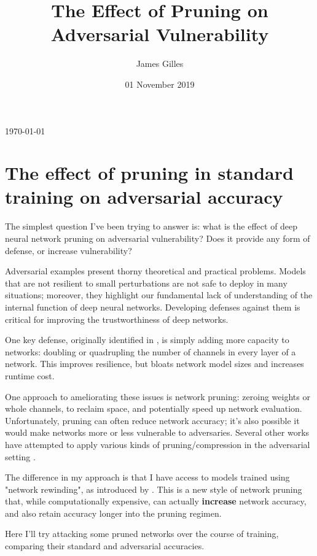 \documentclass[11pt]{article}
\author{James Gilles}
\date{01 November 2019}
\title{The Effect of Pruning on Adversarial Vulnerability}
\renewcommand*{\tableofcontents}{}
\begin{document}
\maketitle
\tableofcontents

\today

\section{The effect of pruning in standard training on adversarial accuracy}
\label{sec:org708dca6}

The simplest question I've been trying to answer is: what is the effect of deep neural network pruning on adversarial vulnerability?
Does it provide any form of defense, or increase vulnerability?

Adversarial examples present thorny theoretical and practical problems.
Models that are not resilient to small perturbations are not safe to deploy in many situations;
moreover, they highlight our fundamental lack of understanding of the internal function of deep neural networks.
Developing defenses against them is critical for improving the trustworthiness of deep networks.

One key defense, originally identified in \citep{TowardsResistantAdversarial}, is simply adding more capacity to networks: doubling or quadrupling
the number of channels in every layer of a network. This improves resilience, but bloats network model sizes and increases runtime cost.

One approach to ameliorating these issues is network pruning: zeroing weights or whole channels, to reclaim space, and potentially speed up network
evaluation. Unfortunately, pruning can often reduce network accuracy; it's also possible it would make networks more or less vulnerable to adversaries.
Several other works have attempted to apply various kinds of pruning/compression in the adversarial setting
\citep{ToCompressOrnot} \citep{RobustnessOrCompression} \citep{DefensiveQuantization}.

The difference in my approach is that I have access to models trained using "network rewinding", as introduced by \citep{StabilizingLTH}. This is a
new style of network pruning that, while computationally expensive, can actually \textbf{increase} network accuracy, and also retain accuracy longer into the pruning
regimen.

Here I'll try attacking some pruned networks over the course of training, comparing their standard and adversarial accuracies.
\end{document}
